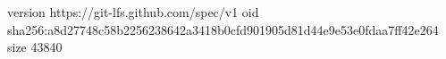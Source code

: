 version https://git-lfs.github.com/spec/v1
oid sha256:a8d27748c58b2256238642a3418b0cfd901905d81d44e9e53e0fdaa7ff42e264
size 43840
